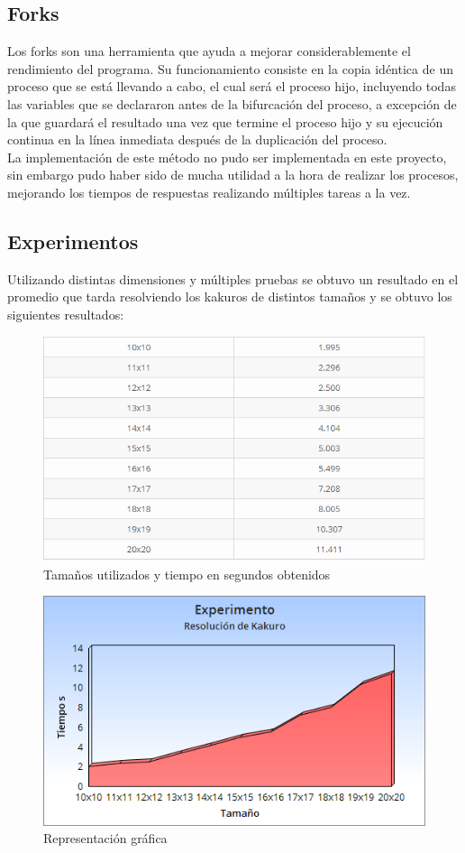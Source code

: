 \documentclass[journal]{IEEEtran}
\begin{document}
\subsection{Forks}
Los forks son una herramienta que ayuda a mejorar considerablemente el rendimiento del programa. Su funcionamiento consiste en la copia idéntica de un proceso que se está llevando a cabo, el cual será el proceso hijo, incluyendo todas las variables que se declararon antes de la bifurcación del proceso, a excepción de la que guardará el resultado una vez que termine el proceso hijo y su ejecución continua en la línea inmediata después de la duplicación del proceso.\\
La implementación de este método no pudo ser implementada en este proyecto, sin embargo pudo haber sido de mucha utilidad a la hora de realizar los procesos, mejorando los tiempos de respuestas realizando múltiples tareas a la vez.

\subsection{Experimentos}
Utilizando distintas dimensiones y múltiples pruebas se obtuvo un resultado en el promedio que tarda resolviendo los kakuros de distintos tamaños y se obtuvo los siguientes resultados:\\

\begin{figure}[h] 
	\centering \includegraphics[width=1\columnwidth]{valores.png}
	\caption{
		\label{fig:samplesetup}
		Tamaños utilizados y tiempo en segundos obtenidos
	}
\end{figure}

\begin{figure}[h] 
	\centering \includegraphics[width=1\columnwidth]{grafico.png}
	\caption{
		\label{fig:samplesetup}
		Representación gráfica
	}
\end{figure}
\end{document}
